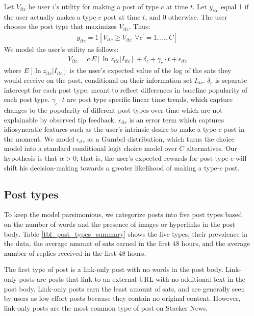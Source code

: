 Let $V_{itc}$ be user $i$'s utility for making a post of type $c$ at time $t$. Let $y_{itc}$ equal 1 if the user actually makes a type $c$ post at time $t$, and 0 otherwise. The user chooses the post type that maximizes $V_{itc}$. Thus:
\begin{align}
y_{itc} = 1\left[ V_{itc} \geq V_{itc^\prime} ~ \forall c^\prime=1, \ldots, C \right]
\end{align}
We model the user's utility as follows:
\begin{align}
V_{itc} = \alpha E \left[\ln z_{itc} | I_{itc} \right] + \delta_{c} +\gamma_c \cdot t + \epsilon_{itc}
\end{align}
where $E\left[ \ln z_{itc} | I_{itc} \right]$ is the user's expected value of the log of the sats they would receive on the post, conditional on their information set $I_{itc}$. $\delta_{c}$ is separate intercept for each post type, meant to reflect differences in baseline popularity of each post type.  $\gamma_c \cdot t$ are post type specific linear time trends, which capture changes to the popularity of different post types over time which are not explainable by observed tip feedback. $\epsilon_{itc}$ is an error term which captures idiosyncratic features such as the user's intrinsic desire to make a type-$c$ post in the moment. We model $\epsilon_{itc}$ as a Gumbel distribution, which turns the choice model into a standard conditional logit choice model over $C$ alternatives. Our hypothesis is that $\alpha > 0$; that is, the user's expected rewards for post type $c$ will shift his decision-making towards a greater likelihood of making a type-$c$ post.

\subsection{Post types}

To keep the model parsimonious, we categorize posts into five post types based on the number of words and the presence of images or hyperlinks in the post body. Table \ref{tbl_post_types_summary} shows the five types, their prevalence in the data, the average amount of sats earned in the first 48 hours, and the average number of replies received in the first 48 hours.

The first type of post is a link-only post with no words in the post body. Link-only posts are posts that link to an external URL with no additional text in the post body. Link-only posts earn the least amount of sats, and are generally seen by users as low effort posts because they contain no original content. However, link-only posts are the most common type of post on Stacker News.


